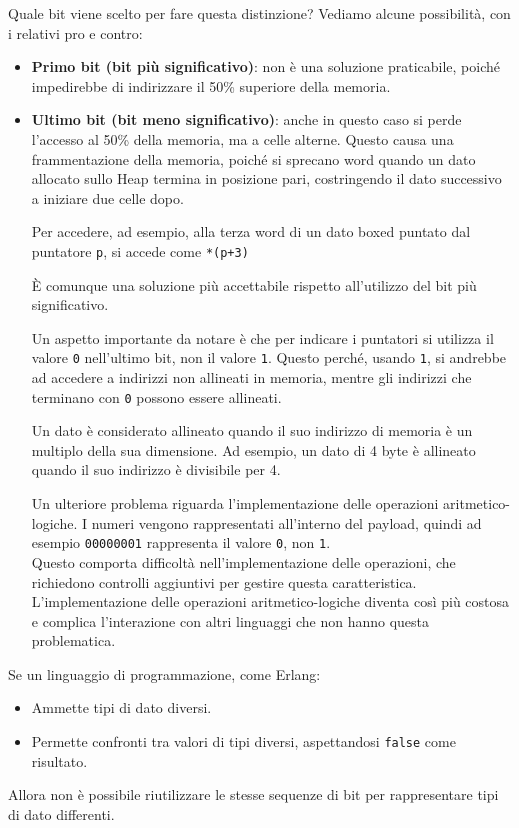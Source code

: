 \documentclass{article}
\begin{document}
Quale bit viene scelto per fare questa distinzione? Vediamo alcune possibilità, con i relativi pro e contro:
\begin{itemize}
    \item \textbf{Primo bit (bit più significativo)}: non è una soluzione praticabile, poiché impedirebbe di indirizzare il 50\% superiore della memoria.
    \item \textbf{Ultimo bit (bit meno significativo)}: anche in questo caso si perde l'accesso al 50\% della memoria, ma a celle alterne. Questo causa una frammentazione della memoria, poiché si sprecano word quando un dato allocato sullo Heap termina in posizione pari, costringendo il dato successivo a iniziare due celle dopo.
    
    Per accedere, ad esempio, alla terza word di un dato boxed puntato dal puntatore \texttt{p}, si accede come \texttt{*(p+3)}

    È comunque una soluzione più accettabile rispetto all'utilizzo del bit più significativo.

    Un aspetto importante da notare è che per indicare i puntatori si utilizza il valore \texttt{0} nell'ultimo bit, non il valore \texttt{1}. Questo perché, usando \texttt{1}, si andrebbe ad accedere a indirizzi non allineati in memoria, mentre gli indirizzi che terminano con \texttt{0} possono essere allineati.
    
    Un dato è considerato allineato quando il suo indirizzo di memoria è un multiplo della sua dimensione. Ad esempio, un dato di 4 byte è allineato quando il suo indirizzo è divisibile per 4.

    Un ulteriore problema riguarda l'implementazione delle operazioni aritmetico-logiche. I numeri vengono rappresentati all'interno del payload, quindi ad esempio \texttt{00000001} rappresenta il valore \texttt{0}, non \texttt{1}.\\
    Questo comporta difficoltà nell'implementazione delle operazioni, che richiedono controlli aggiuntivi per gestire questa caratteristica. L'implementazione delle operazioni aritmetico-logiche diventa così più costosa e complica l'interazione con altri linguaggi che non hanno questa problematica.\\
\end{itemize}

Se un linguaggio di programmazione, come Erlang:
\begin{itemize}
    \item Ammette tipi di dato diversi.
    \item Permette confronti tra valori di tipi diversi, aspettandosi \texttt{false} come risultato.
\end{itemize}
Allora non è possibile riutilizzare le stesse sequenze di bit per rappresentare tipi di dato differenti.
\end{document}
